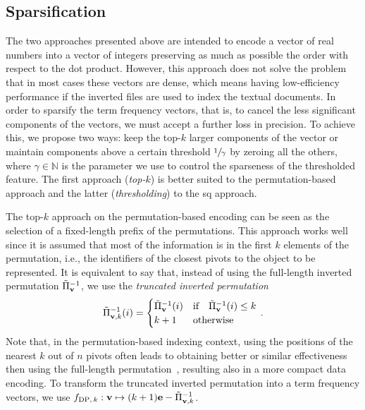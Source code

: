 \subsection{Sparsification}
The two approaches presented above are intended to encode a vector of real numbers into a vector of integers preserving as much as possible the order with respect to the dot product.
However, this approach does not solve the problem that in most cases these vectors are dense, which means having low-efficiency performance if the inverted files are used to index the textual documents.
In order to sparsify the term frequency vectors, that is, to cancel the less significant components of the vectors, we must accept a further loss in precision.
To achieve this, we propose two ways: keep the top-$k$ larger components of the vector or maintain components above a certain threshold $\sfrac{1}{\gamma}$ by zeroing all the others, where $\gamma \in \mathbb{N}$ is the parameter we use to control the sparseness of the thresholded feature.
The first approach (\emph{top-$k$}) is better suited to the permutation-based approach and the latter (\emph{thresholding}) to the \gls{sq} approach.

The top-$k$ approach on the permutation-based encoding can be seen as the selection of a fixed-length prefix of the permutations.
This approach works well since it is assumed that most of the information is in the first $k$ elements of the permutation, i.e., the identifiers of the closest pivots to the object to be represented.
It is equivalent to say that, instead of using the full-length inverted permutation $\tilde{\Pi}^{-1}_{\mathbf{v}}$,  we use the \emph{truncated inverted permutation}
\begin{equation}
\tilde{\Pi}^{-1}_{\mathbf{v},k}(i) = \begin{cases}
                                \tilde{\Pi}^{-1}_{\mathbf{v}} (i) & \text{if} \quad \tilde{\Pi}^{-1}_{\mathbf{v}}(i) \leq k \\
                                k+1                       & \text{otherwise}
                             \end{cases} \,.
\end{equation}
Note that, in the permutation-based indexing context, using the positions of the {nearest} $k$ out of $n$ pivots often leads to obtaining better or similar effectiveness then using the full-length permutation~\cite{amato2014mi,amato2014some}, resulting also in a more compact data encoding.
To transform the truncated inverted permutation into a term frequency vectors, we use $f_{\text{DP},\,k} : \mathbf{v} \mapsto (k+1)\mathbf{e} -\tilde{\Pi}^{-1}_{\mathbf{v},k}$.

